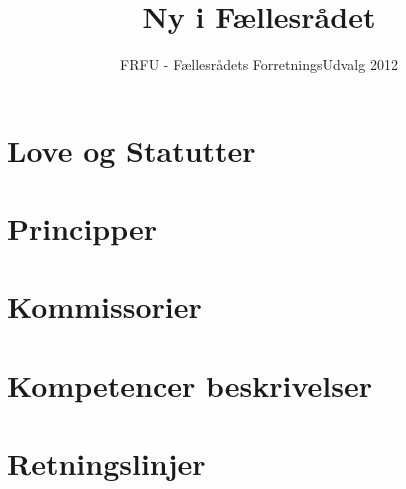 \documentclass[a4paper,danish,12pt,twoside]{report}
\title{Ny i Fællesrådet}
\author{FRFU - Fællesrådets ForretningsUdvalg 2012}
\begin{document}

\tableofcontents
\newpage

\newpage

\part{Love og Statutter}
\setcounter{section}{0}



\newpage


\part{Principper}
\setcounter{section}{0}








\newpage

\part{Kommissorier}
\setcounter{section}{0}






\part{Kompetencer beskrivelser}
\setcounter{section}{0}



\part{Retningslinjer}
\setcounter{section}{0}


%

\end{document}
